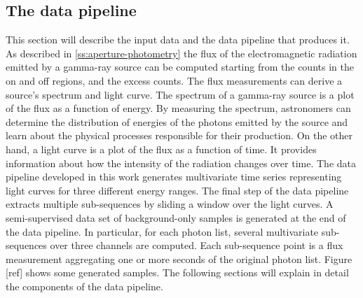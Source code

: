 \subsection{The data pipeline}
\label{ss:data-pipeline}
This section will describe the input data and the data pipeline that produces it. As described in \autoref{ss:aperture-photometry} the flux of the electromagnetic radiation emitted by a gamma-ray source can be computed starting from the counts in the on and off regions, and the excess counts. The flux measurements can derive a source's spectrum and light curve. The spectrum of a gamma-ray source is a plot of the flux as a function of energy. By measuring the spectrum, astronomers can determine the distribution of energies of the photons emitted by the source and learn about the physical processes responsible for their production. On the other hand, a light curve is a plot of the flux as a function of time. It provides information about how the intensity of the radiation changes over time. The data pipeline developed in this work generates multivariate time series representing light curves for three different energy ranges. The final step of the data pipeline extracts multiple sub-sequences by sliding a window over the light curves. 
A semi-supervised data set of background-only samples is generated at the end of the data pipeline. In particular, for each photon list, several multivariate sub-sequences over three channels are computed. Each sub-sequence point is a flux measurement aggregating one or more seconds of the original photon list. Figure [ref] shows some generated samples. The following sections will explain in detail the components of the data pipeline.

